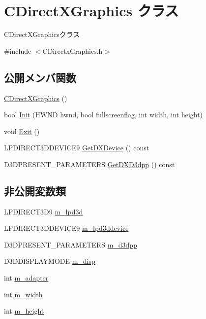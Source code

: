 \hypertarget{class_c_direct_x_graphics}{}\section{C\+Direct\+X\+Graphics クラス}
\label{class_c_direct_x_graphics}


C\+Direct\+X\+Graphicsクラス  




{\ttfamily \#include $<$C\+Directx\+Graphics.\+h$>$}

\subsection*{公開メンバ関数}
\begin{DoxyCompactItemize}
\item 
\mbox{\hyperlink{class_c_direct_x_graphics_ab19e1f0adafda8239186c1e29dbc4eb8}{C\+Direct\+X\+Graphics}} ()
\item 
bool \mbox{\hyperlink{class_c_direct_x_graphics_acb27d62a791eea8193ad09fa6ab06c4c}{Init}} (H\+W\+ND hwnd, bool fullscreenflag, int width, int height)
\item 
void \mbox{\hyperlink{class_c_direct_x_graphics_a0c6f73fc7ecc15cf25ebeb4b85a763f1}{Exit}} ()
\item 
L\+P\+D\+I\+R\+E\+C\+T3\+D\+D\+E\+V\+I\+C\+E9 \mbox{\hyperlink{class_c_direct_x_graphics_ab3fb03fff86412e03c2e1849d0d82eec}{Get\+D\+X\+Device}} () const
\item 
D3\+D\+P\+R\+E\+S\+E\+N\+T\+\_\+\+P\+A\+R\+A\+M\+E\+T\+E\+RS \mbox{\hyperlink{class_c_direct_x_graphics_a545a40df66af3c68df0c4b412dbf8d6c}{Get\+D\+X\+D3dpp}} () const
\end{DoxyCompactItemize}
\subsection*{非公開変数類}
\begin{DoxyCompactItemize}
\item 
L\+P\+D\+I\+R\+E\+C\+T3\+D9 \mbox{\hyperlink{class_c_direct_x_graphics_a24620554e6387ced34e39395fb28c355}{m\+\_\+lpd3d}}
\item 
L\+P\+D\+I\+R\+E\+C\+T3\+D\+D\+E\+V\+I\+C\+E9 \mbox{\hyperlink{class_c_direct_x_graphics_a1ad9965e803d319fde2a6deb55545a03}{m\+\_\+lpd3ddevice}}
\item 
D3\+D\+P\+R\+E\+S\+E\+N\+T\+\_\+\+P\+A\+R\+A\+M\+E\+T\+E\+RS \mbox{\hyperlink{class_c_direct_x_graphics_a5b05d9479514a588a5a28c7d8e84de34}{m\+\_\+d3dpp}}
\item 
D3\+D\+D\+I\+S\+P\+L\+A\+Y\+M\+O\+DE \mbox{\hyperlink{class_c_direct_x_graphics_a6934c9de33591e222c45c4b2461fb90f}{m\+\_\+disp}}
\item 
int \mbox{\hyperlink{class_c_direct_x_graphics_a43ec18b49a8d0c49abd3bc4d3b286a69}{m\+\_\+adapter}}
\item 
int \mbox{\hyperlink{class_c_direct_x_graphics_a0dd76eb8c73ed2682dec9f013a48a6f2}{m\+\_\+width}}
\item 
int \mbox{\hyperlink{class_c_direct_x_graphics_a3143859290ec7b37feb77769b22723a8}{m\+\_\+height}}
\end{DoxyCompactItemize}


